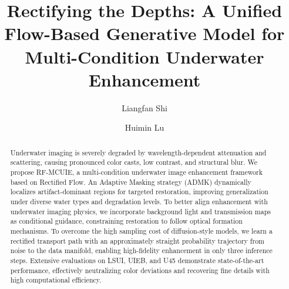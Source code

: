 \documentclass[runningheads]{llncs}
\begin{document}
\title{Rectifying the Depths: A Unified Flow-Based Generative Model for Multi-Condition Underwater Enhancement} 


\author{Liangfan Shi \and
Huimin Lu}



\maketitle


\begin{abstract}
Underwater imaging is severely degraded by wavelength-dependent attenuation and scattering, causing pronounced color casts, low contrast, and structural blur. We propose RF-MCUIE, a multi-condition underwater image enhancement framework based on Rectified Flow. An Adaptive Masking strategy (ADMK) dynamically localizes artifact-dominant regions for targeted restoration, improving generalization under diverse water types and degradation levels. To better align enhancement with underwater imaging physics, we incorporate background light and transmission maps as conditional guidance, constraining restoration to follow optical formation mechanisms. To overcome the high sampling cost of diffusion-style models, we learn a rectified transport path with an approximately straight probability trajectory from noise to the data manifold, enabling high-fidelity enhancement in only three inference steps. Extensive evaluations on LSUI, UIEB, and U45 demonstrate state-of-the-art performance, effectively neutralizing color deviations and recovering fine details with high computational efficiency.
\end{abstract}
\end{document}

